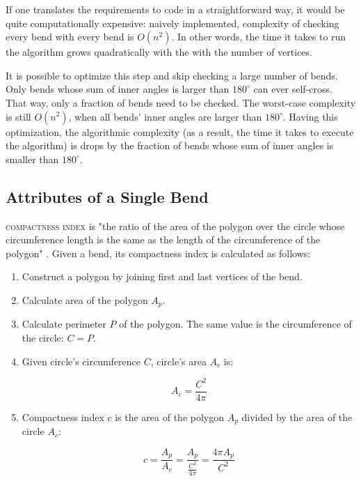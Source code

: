 \documentclass[a4paper]{article}
\begin{document}
If one translates the requirements to code in a straightforward way, it would
be quite computationally expensive: naively implemented, complexity of checking
every bend with every bend is $O(n^2)$. In other words, the time it takes to
run the algorithm grows quadratically with the with the number of vertices.

It is possible to optimize this step and skip checking a large number of bends.
Only bends whose sum of inner angles is larger than $180^\circ$ can ever
self-cross. That way, only a fraction of bends need to be checked. The
worst-case complexity is still $O(n^2)$, when all bends' inner angles are
larger than $180^\circ$. Having this optimization, the algorithmic complexity
(as a result, the time it takes to execute the algorithm) is drops by the
fraction of bends whose sum of inner angles is smaller than $180^\circ$.

\subsection{Attributes of a Single Bend}

\textsc{compactness index} is "the ratio of the area of the polygon over the
circle whose circumference length is the same as the length of the
circumference of the polygon" \cite{wang1998line}. Given a bend, its
compactness index is calculated as follows:

\begin{enumerate}

  \item Construct a polygon by joining first and last vertices of the bend.

  \item Calculate area of the polygon $A_{p}$.

  \item Calculate perimeter $P$ of the polygon. The same value is the
      circumference of the circle: $C = P$.

    \item Given circle's circumference $C$, circle's area $A_{c}$ is:

    \[
      A_c = \frac{C^2}{4\pi}
    \]

  \item Compactness index $c$ is the area of the polygon $A_p$ divided by the
      area of the circle $A_c$:

    \[
      c = \frac{A_p}{A_c} =
          \frac{A_p}{ \frac{C^2}{4\pi} } =
          \frac{4\pi A_p}{C^2}
    \]

\end{enumerate}
\end{document}
